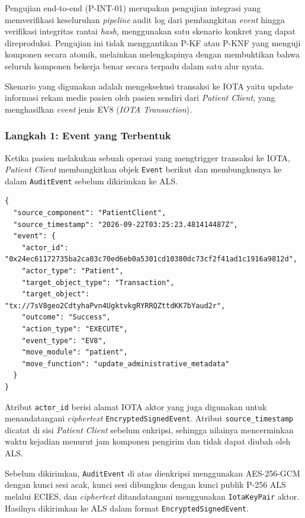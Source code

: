Pengujian end-to-end (P-INT-01) merupakan pengujian integrasi yang
memverifikasi keseluruhan \textit{pipeline} audit log dari pembangkitan
\textit{event} hingga verifikasi integritas rantai \textit{hash}, menggunakan
satu skenario konkret yang dapat direproduksi. Pengujian ini tidak menggantikan
P-KF atau P-KNF yang menguji komponen secara atomik, melainkan melengkapinya
dengan membuktikan bahwa seluruh komponen bekerja benar secara terpadu dalam
satu alur nyata.
 
Skenario yang digunakan adalah mengeksekusi transaksi ke IOTA yaitu update informasi rekam medis pasien oleh pasien sendiri dari \textit{Patient Client}, yang menghasilkan \textit{event}
jenis EV8 (\textit{IOTA Transaction}).
 
\subsubsection{Langkah 1: Event yang Terbentuk}
 
Ketika pasien melakukan sebuah operasi yang mengtrigger transaksi ke IOTA, \textit{Patient Client} membangkitkan
objek \texttt{Event} berikut dan membungkusnya ke dalam \texttt{AuditEvent}
sebelum dikirimkan ke ALS.
 
\begin{verbatim}
{
  "source_component": "PatientClient",
  "source_timestamp": "2026-09-22T03:25:23.481414487Z",
  "event": {
    "actor_id": "0x24ec61172735ba2ca03c70ed6eb0a5301cd10380dc73cf2f41ad1c1916a9812d",
    "actor_type": "Patient",
    "target_object_type": "Transaction",
    "target_object": "tx://7sV8geo2CdtyhaPvn4UgktvkgRYRRQZttdKK7bYaud2r",
    "outcome": "Success",
    "action_type": "EXECUTE",
    "event_type": "EV8",
    "move_module": "patient",
    "move_function": "update_administrative_metadata"
  }
}
\end{verbatim}
 
Atribut \texttt{actor\_id} berisi alamat IOTA aktor yang juga digunakan untuk
menandatangani \textit{ciphertext} \texttt{EncryptedSignedEvent}. Atribut
\texttt{source\_timestamp} dicatat di sisi \textit{Patient Client} sebelum
enkripsi, sehingga nilainya mencerminkan waktu kejadian menurut jam komponen
pengirim dan tidak dapat diubah oleh ALS.
 
Sebelum dikirimkan, \texttt{AuditEvent} di atas dienkripsi menggunakan
AES-256-GCM dengan kunci sesi acak, kunci sesi dibungkus dengan kunci publik
P-256 ALS melalui ECIES, dan \textit{ciphertext} ditandatangani menggunakan
\texttt{IotaKeyPair} aktor. Hasilnya dikirimkan ke ALS dalam format
\texttt{EncryptedSignedEvent}.
 
